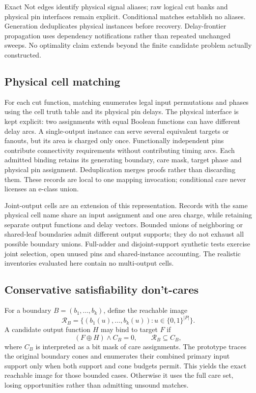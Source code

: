 \documentclass[conference]{IEEEtran}
\begin{document}
Exact Not edges identify physical signal aliases; raw logical cut banks and physical pin interfaces remain explicit. Conditional matches establish no aliases.
Generation deduplicates physical instances before recovery. Delay-frontier propagation uses dependency notifications rather than repeated unchanged sweeps.
No optimality claim extends beyond the finite candidate problem actually constructed.

\subsection{Physical cell matching}
For each cut function, matching enumerates legal input permutations and
phases using the cell truth table and its physical pin delays. The
physical interface is kept explicit: two assignments with equal Boolean
functions can have different delay arcs. A single-output instance can
serve several equivalent targets or fanouts, but its area is charged only
once. Functionally independent pins contribute connectivity requirements
without contributing timing arcs. Each admitted binding retains its generating
boundary, care mask, target phase and physical pin assignment. Deduplication
merges proofs rather than discarding them. These records are local to one
mapping invocation; conditional care never licenses an e-class union.

Joint-output cells are an extension of this representation. Records with
the same physical cell name share an input assignment and one area charge,
while retaining separate output functions and delay vectors. Bounded
unions of neighboring or shared-leaf boundaries admit different output
supports; they do not exhaust all possible boundary unions. Full-adder
and disjoint-support synthetic tests exercise joint selection, open unused
pins and shared-instance accounting. The realistic inventories evaluated
here contain no multi-output cells.

\subsection{Conservative satisfiability don't-cares}
For a boundary $B=(b_1,\ldots,b_k)$, define the reachable image
\begin{equation}
 \mathcal{R}_B=\{(b_1(u),\ldots,b_k(u)):u\in\{0,1\}^{|P|}\}.
\end{equation}
A candidate output function $H$ may bind to target $F$ if
\begin{equation}
 (F\oplus H)\land C_B=0,\qquad \mathcal{R}_B\subseteq C_B,
 \label{eq:care}
\end{equation}
where $C_B$ is interpreted as a bit mask of care assignments. The prototype
traces the original boundary cones and enumerates their combined primary
input support only when both support and cone budgets permit. This yields
the exact reachable image for those bounded cases. Otherwise it uses the
full care set, losing opportunities rather than admitting unsound matches.
\end{document}
